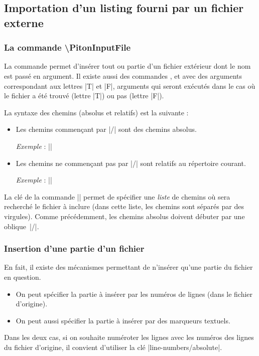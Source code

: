 \documentclass[dvipsnames,svgnames]{article}
\begin{document}
\subsection{Importation d'un listing fourni par un fichier externe}

\label{PitonInputFile}

\subsubsection{La commande \textbackslash PitonInputFile}


La commande  permet d'insérer tout ou partie d'un
fichier extérieur dont le nom est passé en argument. Il existe aussi des commandes
,  et
 avec des arguments correspondant aux lettres |T| et
|F|, arguments qui seront exécutés dans le cas où le fichier a été trouvé (lettre |T|) ou
pas (lettre |F|).

\smallskip
La syntaxe des chemins (absolus et relatifs) est la suivante : 
\begin{itemize}
\item Les chemins commençant par |/| sont des chemins absolus.

\emph{Exemple} : ||

\item Les chemins ne commençant pas par |/| sont relatifs au répertoire courant.

\emph{Exemple} : ||
\end{itemize}


La clé  de la commande |\PitonOptions| permet de spécifier une
\emph{liste} de chemins où sera recherché le fichier à inclure (dans cette liste, les
chemins sont séparés par des virgules). Comme précédemment, les chemins absolus doivent
débuter par une oblique~|/|.


\subsubsection{Insertion d'une partie d'un fichier}

\label{part-of-a-file}

En fait, il existe des mécanismes permettant de n'insérer qu'une partie du fichier en
question.
\begin{itemize}
\item On peut spécifier la partie à insérer par les numéros de lignes (dans le fichier
d'origine).
\item On peut aussi spécifier la partie à insérer par des marqueurs textuels.
\end{itemize}
Dans les deux cas, si on souhaite numéroter les lignes avec les numéros des lignes du
fichier d'origine, il convient d'utiliser la clé |line-numbers/absolute|.
\end{document}
